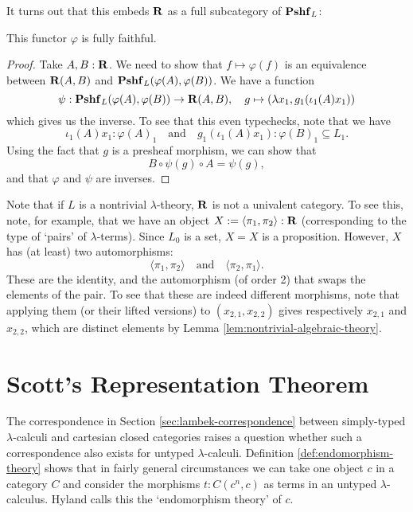 It turns out that this embeds $ \mathbf{R} $ as a full subcategory of $ \mathbf{Pshf}_{L} $:
\begin{lemma}
  This functor $ \varphi $ is fully faithful.
\end{lemma}
\begin{proof}
  Take $ A, B : \mathbf{R} $. We need to show that $ f \mapsto \varphi(f) $ is an equivalence between $ \mathbf{R}(A, B) $ and $ \mathbf{Pshf}_{L}(\varphi(A), \varphi(B)) $. We have a function
  \[ \psi: \mathbf{Pshf}_{L}(\varphi(A), \varphi(B)) \to \mathbf{R}(A, B), \quad g \mapsto (\lambda x_1, g_1(\iota_1(A) x_1)) \]
  which gives us the inverse. To see that this even typechecks, note that we have
  \[ \iota_1(A) x_1 : \varphi(A)_1 \quad \text{and} \quad g_1(\iota_1(A) x_1) : \varphi(B)_1 \subseteq L_1. \]
  Using the fact that $ g $ is a presheaf morphism, we can show that
  \[ B \circ \psi(g) \circ A = \psi(g), \]
  and that $ \varphi $ and $ \psi $ are inverses.
\end{proof}

\begin{remark}
  Note that if $ L $ is a nontrivial $ \lambda $-theory, $ \mathbf{R} $ is not a univalent category. To see this, note, for example, that we have an object $ X := \langle \pi_1, \pi_2 \rangle : \mathbf{R} $ (corresponding to the type of `pairs' of $ \lambda $-terms). Since $ L_0 $ is a set, $ X = X $ is a proposition. However, $ X $ has (at least) two automorphisms:
  \[ \langle \pi_1, \pi_2 \rangle \quad \text{and} \quad \langle \pi_2, \pi_1 \rangle. \]
  These are the identity, and the automorphism (of order 2) that swaps the elements of the pair. To see that these are indeed different morphisms, note that applying them (or their lifted versions) to $ (x_{2, 1}, x_{2, 2}) $ gives respectively $ x_{2, 1} $ and $ x_{2, 2} $, which are distinct elements by Lemma \ref{lem:nontrivial-algebraic-theory}.
\end{remark}

\section{Scott's Representation Theorem}
The correspondence in Section \ref{sec:lambek-correspondence} between simply-typed $ \lambda $-calculi and cartesian closed categories raises a question whether such a correspondence also exists for untyped $ \lambda $-calculi. Definition \ref{def:endomorphism-theory} shows that in fairly general circumstances we can take one object $ c $ in a category $ C $ and consider the morphisms $ t: C(c^n, c) $ as terms in an untyped $ \lambda $-calculus. Hyland calls this the `endomorphism theory' of $ c $.

